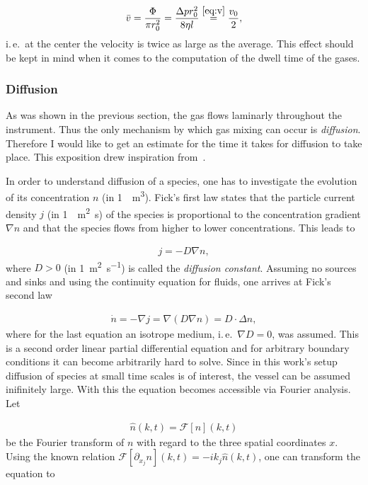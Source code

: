 \begin{align*}
  \bar v = \frac{\Phi}{\pi r_0^2} = \frac{\Delta p r_0^2}{8\eta l} \stackrel{\eqref{eq:v}}{=} \frac{v_0}{2},
\end{align*}
i.\,e.\ at the center the velocity is twice as large as the
average. This effect should be kept in mind when it comes to the
computation of the dwell time of the gases.

\subsubsection{Diffusion}
\label{sec:diffusion}

As was shown in the previous section, the gas flows laminarly
throughout the instrument. Thus the only mechanism by which gas mixing
can occur is \emph{diffusion}. Therefore I would like to get an
estimate for the time it takes for diffusion to take place. This
exposition drew inspiration from~\cite{fluid}.

In order to understand diffusion of a species, one has to investigate
the evolution of its concentration $n$ (in \SI{1}{\per\cubic\meter}).
Fick's first law states that the particle current density $j$ (in
\SI{1}{\per\square\meter\second}) of the species is proportional to
the concentration gradient $\nabla n$ and that the species flows from
higher to lower concentrations. This leads to

\begin{align*}
  j = - D \nabla n,
\end{align*}
where $D > 0$ (in \SI{1}{\square\meter\per\second}) is called the
\emph{diffusion constant}. Assuming no sources and sinks and using the
continuity equation for fluids, one arrives at Fick's second law

\begin{align*}
  \dot n = - \nabla j = \nabla (D \nabla n) = D \cdot \Delta n,
\end{align*}
where for the last equation an isotrope medium, i.\,e.\
$\nabla D = 0$, was assumed. This is a second order linear partial
differential equation and for arbitrary boundary conditions it can
become arbitrarily hard to solve. Since in this work's setup diffusion
of species at small time scales is of interest, the vessel can be
assumed inifinitely large. With this the equation becomes accessible
via Fourier analysis. Let

\begin{align*}
  \hat n(k,t) = \mathcal{F}[n](k,t)
\end{align*}
be the Fourier transform of $n$ with regard to the three spatial
coordinates $x$. Using the known relation $\mathcal{F}[\partial_{x_j}
n](k,t) = -ik_j \hat n(k,t)$, one can transform the equation to

